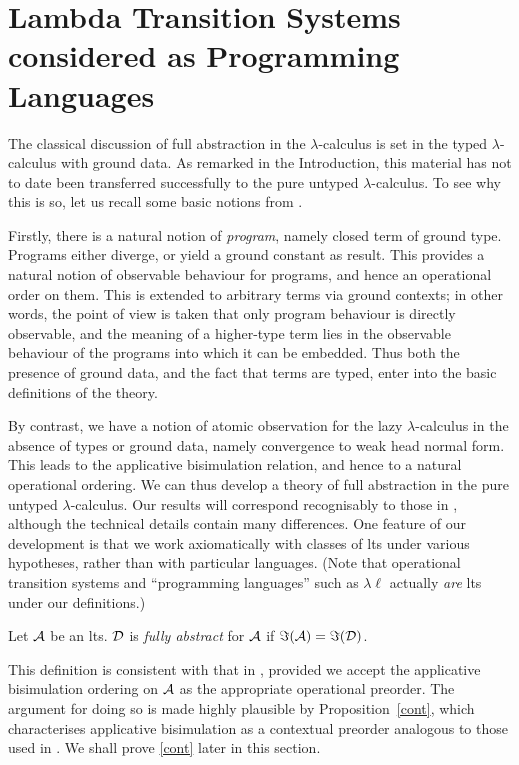 \section{Lambda Transition Systems considered as Programming Languages}
The classical discussion of full abstraction in the  $\lambda$-calculus 
\cite{Plo77,Mil77} is set in the typed $\lambda$-calculus with ground data. 
As remarked in the Introduction, this material has not to date been 
transferred successfully to the pure untyped $\lambda$-calculus. 
To see why this is so, let us recall some basic notions from \cite{Plo77,Mil77}.

Firstly, there is a natural notion of {\em program}, namely closed term of 
ground type. Programs either diverge, or yield a ground constant as result. 
This provides a natural notion of observable behaviour for programs, and 
hence an operational order on them. This is extended to arbitrary terms 
via ground contexts; in other words, the point of view is taken that only 
program behaviour is directly observable, and the meaning of a higher-type 
term lies in the observable behaviour of the programs into which it can be 
embedded. 
Thus both the presence of ground data, and the fact that terms are typed, 
enter into the basic definitions of the theory.

By contrast, we have a notion of atomic observation for the lazy 
$\lambda$-calculus in the absence of types or ground data, namely convergence 
to weak head normal form. This leads to the applicative bisimulation relation, 
and hence to a natural operational ordering. 
We can thus develop a theory of full abstraction in the pure untyped 
$\lambda$-calculus. 
Our results will correspond recognisably to those in \cite{Plo77}, although 
the technical details contain many differences. One feature of 
our development is that we work axiomatically with classes of lts under 
various hypotheses, rather than with particular languages. 
(Note that operational transition systems and ``programming languages'' such as $\lambda \ell$ actually {\em are} lts under our definitions.)
\begin{definition}
{\rm Let $\cal A$ be an lts. $\cal D$ is {\em fully abstract} for $\cal A$ if ${\Im}({\cal A}) = {\Im}({\cal D})$. }
\end{definition}
This definition is consistent with that in \cite{Plo77,Mil77}, provided 
we accept the applicative bisimulation ordering on $\cal A$ as 
the appropriate operational preorder. The argument for doing so 
is made highly plausible by Proposition~\ref{cont}, which characterises 
applicative bisimulation as a contextual preorder analogous to those used 
in \cite{Plo77,Mil77}. We shall prove \ref{cont} later in this section.

